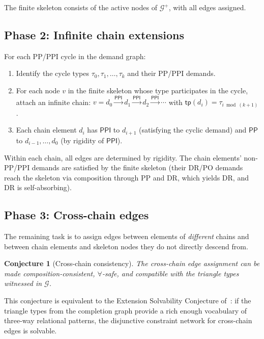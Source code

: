 \documentclass[a4paper,11pt]{article}
\newtheorem{conjecture}[theorem]{Conjecture}
\theoremstyle{definition}
\newcommand{\PP}{\ensuremath{\mathsf{PP}}}
\newcommand{\PPI}{\ensuremath{\mathsf{PPI}}}
\newcommand{\tp}{\ensuremath{\mathsf{tp}}}
\begin{document}
The finite skeleton consists of the active nodes of $\mathcal{G}^+$,
with all edges assigned.

\subsection{Phase 2: Infinite chain extensions}

For each PP/PPI cycle in the demand graph:

\begin{enumerate}[nosep]
  \item Identify the cycle types $\tau_0, \tau_1, \ldots, \tau_k$
    and their PP/PPI demands.
  \item For each node $v$ in the finite skeleton whose type
    participates in the cycle, attach an infinite chain:
    $v = d_0 \stackrel{\PPI}{\to} d_1 \stackrel{\PPI}{\to}
    d_2 \stackrel{\PPI}{\to} \cdots$
    with $\tp(d_i) = \tau_{i \bmod (k+1)}$.
  \item Each chain element $d_i$ has $\PPI$ to $d_{i+1}$
    (satisfying the cyclic demand) and $\PP$ to $d_{i-1}, \ldots,
    d_0$ (by rigidity of $\PPI$).
\end{enumerate}

Within each chain, all edges are determined by rigidity.  The
chain elements' non-PP/PPI demands are satisfied by the finite
skeleton (their DR/PO demands reach the skeleton via composition
through PP and DR, which yields DR, and DR is self-absorbing).


\subsection{Phase 3: Cross-chain edges}
\label{sec:cross-edges}

The remaining task is to assign edges between elements of
\emph{different} chains and between chain elements and skeleton
nodes they do not directly descend from.

\begin{conjecture}[Cross-chain consistency]
\label{conj:cross-chain}
The cross-chain edge assignment can be made composition-consistent,
$\forall$-safe, and compatible with the triangle types witnessed
in $\mathcal{G}$.
\end{conjecture}

This conjecture is equivalent to the Extension Solvability
Conjecture of~\cite{TrianglePaper}: if the triangle types from the
completion graph provide a rich enough vocabulary of three-way
relational patterns, the disjunctive constraint network for
cross-chain edges is solvable.
\end{document}
